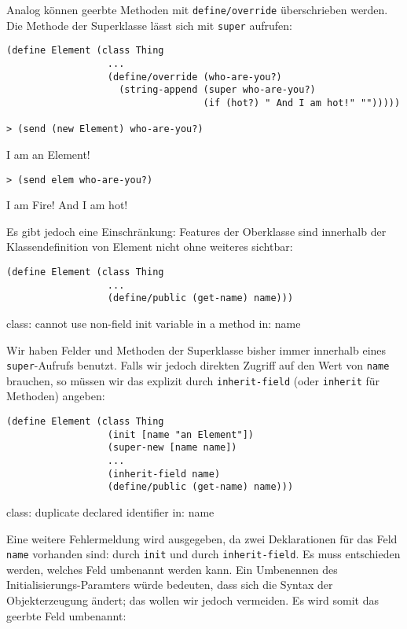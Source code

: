Analog können geerbte Methoden mit \texttt{define/override} überschrieben werden. Die Methode der Superklasse lässt sich mit \texttt{super} aufrufen:

\begin{lstlisting}
(define Element (class Thing 
                  ...
                  (define/override (who-are-you?)
                    (string-append (super who-are-you?)
                                   (if (hot?) " And I am hot!" "")))))
                                   
> (send (new Element) who-are-you?)
\end{lstlisting}
{\routput {\qq}I am an Element!\qq}

\begin{lstlisting}
> (send elem who-are-you?)
\end{lstlisting}
{\routput {\qq}I am Fire! And I am hot!\qq}

Es gibt jedoch eine Einschränkung: Features der Oberklasse sind innerhalb der Klassendefinition von Element nicht ohne weiteres sichtbar: 

\begin{lstlisting}
(define Element (class Thing 
                  ...
                  (define/public (get-name) name)))
\end{lstlisting}
{\rerror class: cannot use non-field init variable in a method in: name}

Wir haben Felder und Methoden der Superklasse bisher immer innerhalb eines \texttt{super}-Aufrufs benutzt. Falls wir jedoch direkten Zugriff auf den Wert von \texttt{name} brauchen, so müssen wir das explizit durch \texttt{inherit-field} (oder \texttt{inherit} für Methoden) angeben:

\begin{lstlisting}
(define Element (class Thing 
                  (init [name "an Element"])
                  (super-new [name name])
                  ...
                  (inherit-field name)
                  (define/public (get-name) name)))
\end{lstlisting}
{\rerror  class: duplicate declared identifier in: name}

Eine weitere Fehlermeldung wird ausgegeben, da zwei Deklarationen für das Feld \texttt{name} vorhanden sind: durch \texttt{init} und durch \texttt{inherit-field}. Es muss entschieden werden, welches Feld umbenannt werden kann. Ein Umbenennen des Initialisierungs-Paramters würde bedeuten, dass sich die Syntax der Objekterzeugung ändert; das wollen wir jedoch vermeiden. Es wird somit das geerbte Feld umbenannt:

